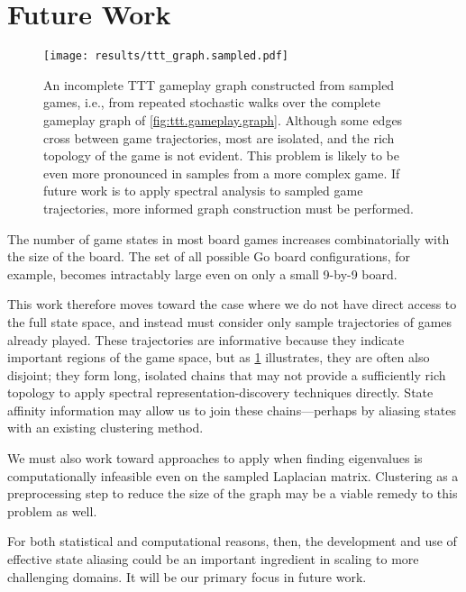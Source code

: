 \section{Future Work}

\begin{figure}
\begin{center}
\texttt{[image: results/ttt\_graph.sampled.pdf]}
\end{center}
\caption{\label{fig:ttt.sampled.graph}An incomplete TTT gameplay graph
constructed from sampled games, i.e., from repeated stochastic walks over the
complete gameplay graph of \cref{fig:ttt.gameplay.graph}. Although some edges
cross between game trajectories, most are isolated, and the rich topology of
the game is not evident. This problem is likely to be even more pronounced in
samples from a more complex game. If future work is to apply spectral analysis
to sampled game trajectories, more informed graph construction must be
performed.}
\end{figure}

The number of game states in most board games increases combinatorially with
the size of the board. The set of all possible Go board configurations, for
example, becomes intractably large even on only a small 9-by-9 board.

This work therefore moves toward the case where we do not have direct access to
the full state space, and instead must consider only sample trajectories of
games already played. These trajectories are informative because they indicate
important regions of the game space, but as \cref{fig:ttt.sampled.graph}
illustrates, they are often also disjoint; they form long, isolated chains that
may not provide a sufficiently rich topology to apply spectral
representation-discovery techniques directly. State affinity information may
allow us to join these chains---perhaps by aliasing states with an existing
clustering method.

We must also work toward approaches to apply when finding eigenvalues is
computationally infeasible even on the sampled Laplacian matrix. Clustering as
a preprocessing step to reduce the size of the graph may be a viable remedy to
this problem as well.

For both statistical and computational reasons, then, the development and use
of effective state aliasing could be an important ingredient in scaling to more
challenging domains. It will be our primary focus in future work.

